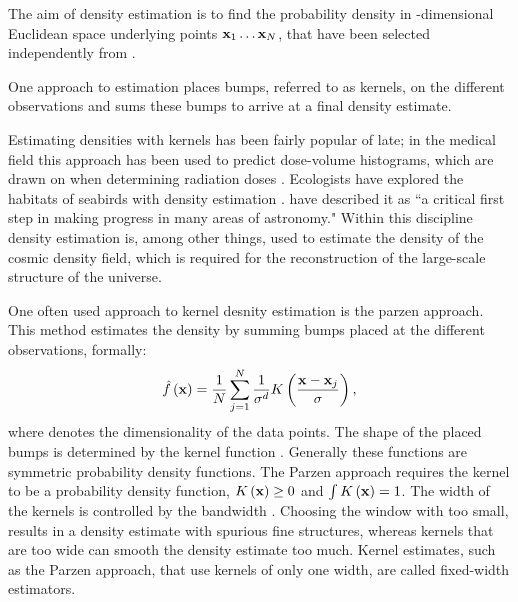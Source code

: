 The aim of density estimation is to find the probability density \varDensityFunction{\varPattern} in \varDim-dimensional Euclidean space underlying \varNumPatterns points $\varPattern[1] \dotsc \varPattern[\varNumPatterns]$, that have been selected independently from \varDensityFunction{\varPattern}. 

One approach to estimation \varDensityFunction{\varPattern} places bumps, referred to as kernels, on the different observations and sums these bumps to arrive at a final density estimate. 

Estimating densities with kernels has been fairly popular of late; in the medical field this approach has been used to predict dose-volume histograms, which are drawn on when determining radiation doses \cite{SkarpmanDose2015}. Ecologists have explored the habitats of seabirds with density estimation \cite{lees2016using}. \textcite{ferdosi2011comparison} have described it as ``a critical first step in making progress in many areas of astronomy."  Within this discipline  density estimation is, among other things, used to estimate the density of the cosmic density field, which is required for the reconstruction of the large-scale structure of the universe.

	One often used approach to kernel desnity estimation is the parzen approach\cite{parzen1962estimation}. This method estimates the density by summing bumps placed at the different observations, formally:
	\begin{equation}\label{eq:1:parzen}
		\varEstimatedDensityFunction{\varPattern} = \frac{1}{\varNumPatterns}\sum_{j = 1}^{\varNumPatterns} \frac{1}{\varBandwidth^\varDim}\varKernel{\frac{\varPattern - \varPattern[j]}{\varBandwidth}},
	\end{equation}
	where \varDim denotes the dimensionality of the data points. The shape of the placed bumps is determined by the kernel function \varKernel{\cdot}. Generally these functions are symmetric probability density functions. The Parzen approach requires the kernel to be a probability density function, \ie $\varKernel{\varPattern} \geq 0$ and $\int \varKernel{\varPattern} = 1$. 
	The width of the kernels is controlled by the bandwidth \varBandwidth \cite{silverman1986density}. Choosing the window with too small, results in a density estimate with spurious fine structures, whereas kernels that are too wide can smooth the density estimate too much. Kernel estimates, such as the Parzen approach, that use kernels of only one width, are called fixed-width estimators.


